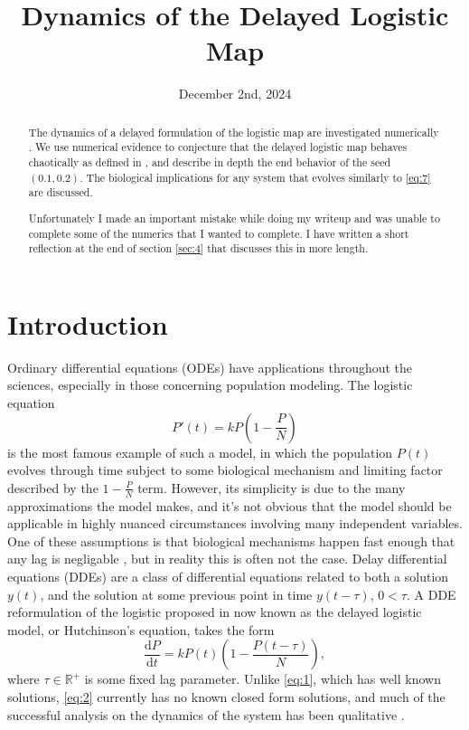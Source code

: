 \documentclass[11pt, letterpaper]{article}
\title{Dynamics of the Delayed Logistic Map}
\date{December 2nd, 2024}
\begin{document}
\maketitle
\begin{abstract}
	The dynamics of a delayed formulation of the logistic map are investigated numerically \cite{text}. We use numerical evidence to conjecture that the delayed logistic map behaves chaotically as defined in \cite{devaney}, and describe in depth the end behavior of the seed $(0.1,0.2)$. The biological implications for any system that evolves similarly to \eqref{eq:7} are discussed.

	Unfortunately I made an important mistake while doing my writeup and was unable to complete some of the numerics that I wanted to complete. I have written a short reflection at the end of section \ref{sec:4} that discusses this in more length.
\end{abstract}
\section{Introduction}\label{sec:1}
Ordinary differential equations (ODEs) have applications throughout the sciences, especially in those concerning population modeling. The logistic equation
\begin{equation}\label{eq:1}
	P'(t)=kP\left(1-\frac{P}{N}\right)
\end{equation}
is the most famous example of such a model, in which the population $P(t)$ evolves through time subject to some biological mechanism and limiting factor described by the $1-\frac{P}{N}$ term. However, its simplicity is due to the many approximations the model makes, and it's not obvious that the model should be applicable in highly nuanced circumstances involving many independent variables. One of these assumptions is that biological mechanisms happen fast enough that any lag is negligable \cite{hutchinson}, but in reality this is often not the case. Delay differential equations (DDEs) are a class of differential equations related to both a solution $y(t)$, and the solution at some previous point in time $y(t-\tau )$, $0<\tau $. A DDE reformulation of the logistic proposed in \cite{hutchinson} now known as the delayed logistic model, or Hutchinson's equation, takes the form
\begin{equation}\label{eq:2}
	\frac{\mathrm{d}P}{\mathrm{d}t}=kP(t)\left( 1-\frac{P(t-\tau )}{N} \right)  
,\end{equation}
where $\tau \in\mathbb{R}^+$ is some fixed lag parameter. Unlike \eqref{eq:1}, which has well known solutions, \eqref{eq:2} currently has no known closed form solutions, and much of the successful analysis on the dynamics of the system has been qualitative \cite{ddes}.
\end{document}
